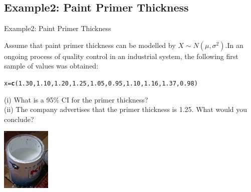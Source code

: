 \documentclass[t,xcolor=pdftex,dvipsnames,table]{beamer}
\makeatletter
\newcommand{\hlnum}[1]{\textcolor[rgb]{0.686,0.059,0.569}{#1}}%
\newcommand{\hlstd}[1]{\textcolor[rgb]{0.345,0.345,0.345}{#1}}%
\newcommand{\hlkwb}[1]{\textcolor[rgb]{0.69,0.353,0.396}{#1}}%
\newcommand{\hlkwd}[1]{\textcolor[rgb]{0.737,0.353,0.396}{\textbf{#1}}}%
\newenvironment{kframe}{%
 \def\at@end@of@kframe{}%
 \ifinner\ifhmode%
  \def\at@end@of@kframe{\end{minipage}}%
  \begin{minipage}{\columnwidth}%
 \fi\fi%
 \def\FrameCommand##1{\hskip\@totalleftmargin \hskip-\fboxsep
 \colorbox{shadecolor}{##1}\hskip-\fboxsep
     \hskip-\linewidth \hskip-\@totalleftmargin \hskip\columnwidth}%
 \MakeFramed {\advance\hsize-\width
   \@totalleftmargin\z@ \linewidth\hsize
   \@setminipage}}%
 {\par\unskip\endMakeFramed%
 \at@end@of@kframe}
\newenvironment{knitrout}{}{} %
\makeatother
\begin{document}
\subsection[Examples]{Example2: Paint Primer Thickness}
\begin{frame}{Example2: Paint Primer Thickness}

Assume that paint primer thickness can be modelled by $X \sim N(\mu, \sigma^2)$.In an ongoing process of quality control in an industrial system, the following first sample of values was obtained:

\begin{knitrout}
\color{fgcolor}\begin{kframe}
\begin{alltt}
\hlstd{x}\hlkwb{=}\hlkwd{c}\hlstd{(}\hlnum{1.30}\hlstd{,}\hlnum{1.10}\hlstd{,}\hlnum{1.20}\hlstd{,}\hlnum{1.25}\hlstd{,}\hlnum{1.05}\hlstd{,}\hlnum{0.95}\hlstd{,}\hlnum{1.10}\hlstd{,}\hlnum{1.16}\hlstd{,}\hlnum{1.37}\hlstd{,}\hlnum{0.98}\hlstd{)}
\end{alltt}
\end{kframe}
\end{knitrout}

(i) What is a 95\% CI for the primer thickness? \\

(ii) The company advertises that the primer thickness is 1.25. What would you conclude?

\begin{center}
\includegraphics[height=3cm]{../images/Primer.jpg}
\end{center}
\end{frame}
\end{document}
